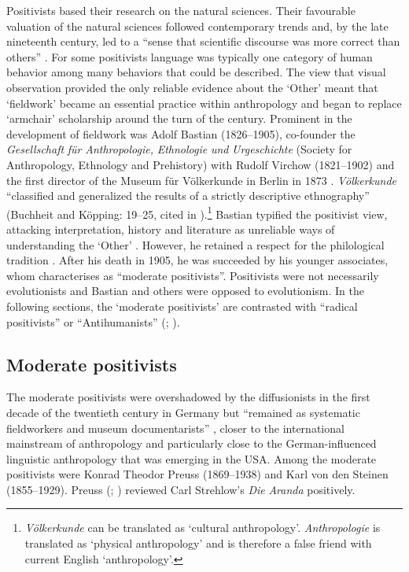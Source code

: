 \documentclass[output=paper]{../langscibook}
\begin{document}
Positivists based their research on the natural sciences. Their favourable valuation of the natural sciences followed contemporary trends and, by the late nineteenth century, led to a ``sense that scientific discourse was more correct than others'' \citep[154]{crick_explorations_1976}. For some positivists language was typically one category of human behavior among many behaviors that could be described. The view that visual observation provided the only reliable evidence about the ‘Other’ meant that ‘fieldwork’ became an essential practice within anthropology and began to replace ‘armchair’ scholarship around the turn of the century. Prominent in the development of fieldwork was Adolf Bastian (1826--1905), co-founder the \textit{Gesellschaft} \textit{für} \textit{Anthropologie,} \textit{Ethnologie} \textit{und} \textit{Urgeschichte} (Society for Anthropology, Ethnology and Prehistory) with Rudolf Virchow (1821--1902) and the first director of the Museum für Völkerkunde in Berlin in 1873 \citep{kopping_adolf_1983}. \textit{Völkerkunde} ``classified and generalized the results of a strictly descriptive ethnography'' (Buchheit and Köpping: 19--25, cited in \citealt[87]{barth_german-speaking_2005}).\footnote{\textit{Völkerkunde} can be translated as `cultural anthropology'. \textit{Anthropologie} is translated as `physical anthropology' \citep[82]{stocking_virchow_1996} and is therefore a false friend with current English `anthropology'.} Bastian typified the positivist view, attacking interpretation, history and literature as unreliable ways of understanding the ‘Other’ \citep[61]{zimmerman_anthropology_2001}. However, he retained a respect for the philological tradition \citep[89]{barth_german-speaking_2005}.  After his death in 1905, he was succeeded by his younger associates, whom \citet[91]{barth_german-speaking_2005} characterises as ``moderate positivists''. Positivists were not necessarily evolutionists and Bastian and others were opposed to evolutionism. In the following sections, the ‘moderate positivists’ \citep[99]{barth_german-speaking_2005} are contrasted with ``radical positivists'' or ``Antihumanists'' (\citealt{zimmerman_anthropology_2001}; \citealt{monteath_globalising_2013}). 

\subsection{Moderate positivists}

The moderate positivists were overshadowed by the diffusionists in the first decade of the twentieth century in Germany but “remained as systematic fieldworkers and museum documentarists” \citep[92]{barth_german-speaking_2005}, closer to the international mainstream of anthropology and particularly close to the German-influenced linguistic anthropology that was emerging in the USA. Among the moderate positivists were Konrad Theodor Preuss (1869--1938) and Karl von den Steinen (1855--1929). Preuss (\citeyear{preuss_review_1908}; \citeyear{preuss_geographie_1909}) reviewed Carl Strehlow’s \textit{Die} \textit{Aranda} positively. 
\end{document}
